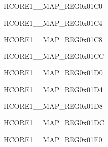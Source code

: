\begin{register}{H}{CORE1\_\_MAP\_REG}{0x01C0}\label{regdesc:CORE1HPPAUINTMAPREG}
\end{register}\vspace{-3em}


\begin{register}{H}{CORE1\_\_MAP\_REG}{0x01C4}\label{regdesc:CORE1HPPARLIORXINTMAPREG}
\end{register}\vspace{-3em}


\begin{register}{H}{CORE1\_\_MAP\_REG}{0x01C8}\label{regdesc:CORE1HPPARLIOTXINTMAPREG}
\end{register}\vspace{-3em}


\begin{register}{H}{CORE1\_\_MAP\_REG}{0x01CC}\label{regdesc:CORE1H264DMA2DOUTCH0INTMAPREG}
\end{register}\vspace{-3em}


\begin{register}{H}{CORE1\_\_MAP\_REG}{0x01D0}\label{regdesc:CORE1H264DMA2DOUTCH1INTMAPREG}
\end{register}\vspace{-3em}


\begin{register}{H}{CORE1\_\_MAP\_REG}{0x01D4}\label{regdesc:CORE1H264DMA2DOUTCH2INTMAPREG}
\end{register}\vspace{-3em}


\begin{register}{H}{CORE1\_\_MAP\_REG}{0x01D8}\label{regdesc:CORE1H264DMA2DOUTCH3INTMAPREG}
\end{register}\vspace{-3em}


\begin{register}{H}{CORE1\_\_MAP\_REG}{0x01DC}\label{regdesc:CORE1H264DMA2DOUTCH4INTMAPREG}
\end{register}\vspace{-3em}


\begin{register}{H}{CORE1\_\_MAP\_REG}{0x01E0}\label{regdesc:CORE1H264DMA2DINCH0INTMAPREG}
\end{register}\vspace{-3em}



